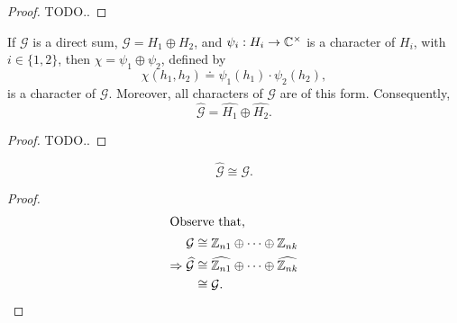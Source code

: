\begin{proof}
	TODO..
\end{proof}

\begin{prop}
	If $\mathcal{G}$ is a direct sum, $\mathcal{G} = H_1 \oplus H_2$, and
	$\psi_i : H_i \to \mathbb{C}^{\times}$ is a character of $H_i$, with $i \in \{1,2\}$,
	then $\chi = \psi_1 \oplus \psi_2$, defined by
	\[
		\chi(h_1,h_2) \doteq \psi_1(h_1) \cdot \psi_2(h_2),
	\]
	is a character of $\mathcal{G}$. Moreover, all characters of $\mathcal{G}$ are
	of this form. Consequently,
	\[
		\widehat{\mathcal{G}} = \widehat{H_1} \oplus \widehat{H_2}.
	\]
\end{prop}

\begin{proof}
	TODO..
\end{proof}

\begin{cor}
	\[
		\widehat{\mathcal{G}} \cong \mathcal{G}.
	\]
\end{cor}

\begin{proof}
	\begin{align*}
		\intertext{Observe that,}
		\mathcal{G} &\cong \mathbb{Z}_{n1} \oplus \dots \oplus \mathbb{Z}_{nk}
		\\
		\Rightarrow \widehat{\mathcal{G}}
		&\cong \widehat{\mathbb{Z}_{n1}} \oplus \dots \oplus \widehat{\mathbb{Z}_{nk}}
		\\
		&\cong \mathcal{G}. \qedhere
	\end{align*}
\end{proof}
